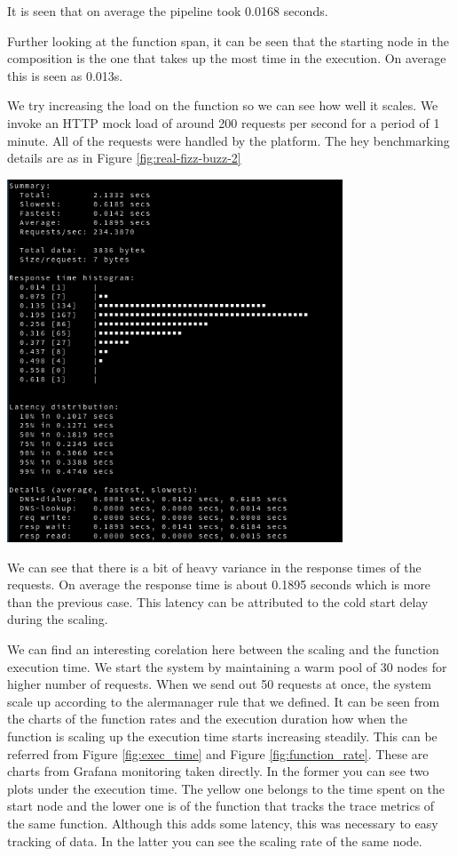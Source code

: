 \documentclass[12pt,titlepage]{article}
\begin{document}
It is seen that on average the pipeline took 0.0168 seconds.

Further looking at the function span, it can be seen that the starting node in the
composition is the one that takes up the most time in the execution. On average
this is seen as 0.013s.

We try increasing the load on the function so we can see how well it scales. We
invoke an HTTP mock load of around 200 requests per second for a period of 1 minute. 
All of the requests were handled by the platform. The hey benchmarking details
are as in Figure \ref{fig:real-fizz-buzz-2}
\begin{center}
   \begin{minipage}{\linewidth}
     \centering
    \includegraphics[width=100mm]{./thesis_images/real-fizz-buzz-2.png}
    \label{fig:real-fizz-buzz-2}
\end{minipage}
\end{center}
We can see that there is a bit of heavy variance in the response times of the
requests. On average the response time is about 0.1895 seconds which is more
than the previous case. This latency can be attributed to the cold start delay
during the scaling.

We can find an interesting corelation here between the scaling and the function
execution time. We start the system by maintaining a warm pool of 30 nodes for
higher number of requests. When we send out 50 requests at once, the system
scale up according to the alermanager rule that we defined. It can be seen from
the charts of the function rates and the execution duration how when the function 
is scaling up the execution time starts increasing steadily. This can be
referred from Figure \ref{fig:exec_time} and Figure \ref{fig:function_rate}.
These are charts from Grafana monitoring taken directly. In the former you can
see two plots under the execution time. The yellow one belongs to the time
spent on the start node and the lower one is of the function that tracks the
trace metrics of the same function. Although this adds some latency, this was
necessary to easy tracking of data. In the latter you can see the scaling rate
of the same node.
\end{document}
